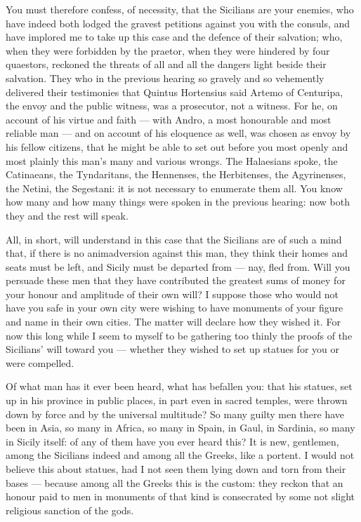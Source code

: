  You must therefore confess, of necessity, that the Sicilians are your enemies, who have indeed both lodged the gravest petitions against you with the consuls, and have implored me to take up this case and the defence of their salvation; who, when they were forbidden by the praetor, when they were hindered by four quaestors, reckoned the threats of all and all the dangers light beside their salvation. They who in the previous hearing so gravely and so vehemently delivered their testimonies that Quintus Hortensius said Artemo of Centuripa, the envoy and the public witness, was a prosecutor, not a witness. For he, on account of his virtue and faith --- with Andro, a most honourable and most reliable man --- and on account of his eloquence as well, was chosen as envoy by his fellow citizens, that he might be able to set out before you most openly and most plainly this man's many and various wrongs. The Halaesians spoke, the Catinaeans, the Tyndaritans, the Hennenses, the Herbitenses, the Agyrinenses, the Netini, the Segestani: it is not necessary to enumerate them all. You know how many and how many things were spoken in the previous hearing: now both they and the rest will speak.

 All, in short, will understand in this case that the Sicilians are of such a mind that, if there is no animadversion against this man, they think their homes and seats must be left, and Sicily must be departed from --- nay, fled from. Will you persuade these men that they have contributed the greatest sums of money for your honour and amplitude of their own will? I suppose those who would not have you safe in your own city were wishing to have monuments of your figure and name in their own cities. The matter will declare how they wished it. For now this long while I seem to myself to be gathering too thinly the proofs of the Sicilians' will toward you --- whether they wished to set up statues for you or were compelled.

 Of what man has it ever been heard, what has befallen you: that his statues, set up in his province in public places, in part even in sacred temples, were thrown down by force and by the universal multitude? So many guilty men there have been in Asia, so many in Africa, so many in Spain, in Gaul, in Sardinia, so many in Sicily itself: of any of them have you ever heard this? It is new, gentlemen, among the Sicilians indeed and among all the Greeks, like a portent. I would not believe this about statues, had I not seen them lying down and torn from their bases --- because among all the Greeks this is the custom: they reckon that an honour paid to men in monuments of that kind is consecrated by some not slight religious sanction of the gods.

